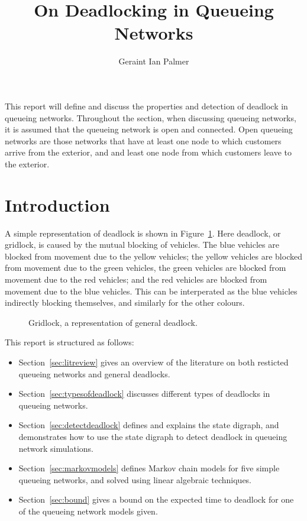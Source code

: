 \documentclass{article}
\title{On Deadlocking in Queueing Networks}
\author{Geraint Ian Palmer}
\date{}
\begin{document}
\onehalfspacing

\maketitle

This report will define and discuss the properties and detection of deadlock in queueing networks.
Throughout the section, when discussing queueing networks, it is assumed that
the queueing network is open and connected.
Open queueing networks are those networks that have at least one node to which customers arrive from the exterior, and and least one node from which customers leave to the exterior.

\section{Introduction}

A simple representation of deadlock is shown in Figure~\ref{fig:gridlock}.
Here deadlock, or gridlock, is caused by the mutual blocking of vehicles.
The blue vehicles are blocked from movement due to the yellow vehicles; the yellow vehicles are blocked from movement due to the green vehicles, the green vehicles are blocked from movement due to the red vehicles; and the red vehicles are blocked from movement due to the blue vehicles.
This can be interperated as the blue vehicles indirectly blocking themselves, and similarly for the other colours.

\begin{figure}[!htbp]
  \begin{center}
  
  \caption{Gridlock, a representation of general deadlock.}
  \label{fig:gridlock}
  \end{center}
\end{figure}

This report is structured as follows:

\begin{itemize}
  \item Section~\ref{sec:litreview} gives an overview of the literature on both resticted queueing networks and general deadlocks.
  \item Section~\ref{sec:typesofdeadlock} discusses different types of deadlocks in queueing networks.
  \item Section~\ref{sec:detectdeadlock} defines and explains the state digraph, and demonstrates how to use the state digraph to detect deadlock in queueing network simulations.
  \item Section~\ref{sec:markovmodels} defines Markov chain models for five simple queueing networks, and solved using linear algebraic techniques.
  \item Section~\ref{sec:bound} gives a bound on the expected time to deadlock for one of the queueing network models given.
\end{itemize}
\end{document}
